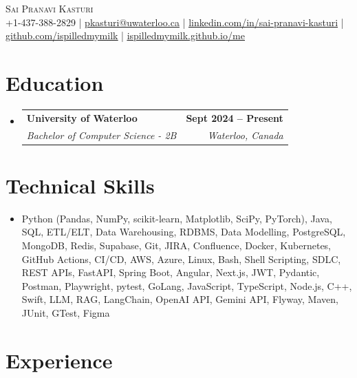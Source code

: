 \documentclass[letterpaper,10pt]{article}
\makeatletter
\newcommand{\resumeSubheading}[4]{
  \vspace{-1pt}\item
    \begin{tabular*}{1.0\textwidth}[t]{l@{\extracolsep{\fill}}r}
      \textbf{#1} & \textbf{\small #2} \\
      \textit{\small#3} & \textit{\small #4} \\[-2pt]
    \end{tabular*}\vspace{-7pt}
}
\newcommand{\resumeSubHeadingListStart}{\begin{itemize}[leftmargin=0.0in, label={}]}
\newcommand{\resumeSubHeadingListEnd}{\end{itemize}}
\makeatother
\begin{document}

\vspace{-28pt}
\begin{center}
    {\Huge \scshape Sai Pranavi Kasturi} \\ 
    
    \small +1-437-388-2829 | \underline{pkasturi@uwaterloo.ca} | \href{https://linkedin.com/in/sai-pranavi-kasturi-704807298}{\underline{linkedin.com/in/sai-pranavi-kasturi}} | \href{https://github.com/ispilledmymilk}{\underline{github.com/ispilledmymilk}} | \href{https://ispilledmymilk.github.io/me/}{\underline{ispilledmymilk.github.io/me}}
    \vspace{-10pt}
\end{center}

\vspace{-10pt}
\section{Education}
  \resumeSubHeadingListStart
    \resumeSubheading
      {University of Waterloo}{Sept 2024 -- Present}
      {Bachelor of Computer Science - 2B}{Waterloo, Canada}
  \resumeSubHeadingListEnd
\vspace{-8pt}
  

\section{Technical Skills}
\begin{itemize}[leftmargin=0.05in, label={}]
  \small\item{
    Python (Pandas, NumPy, scikit-learn, Matplotlib, SciPy, PyTorch), Java, SQL, ETL/ELT, Data Warehousing, RDBMS, Data Modelling, PostgreSQL, MongoDB, Redis, Supabase, Git, JIRA, Confluence, Docker, Kubernetes, GitHub Actions, CI/CD, AWS, Azure, Linux, Bash, Shell Scripting, SDLC, REST APIs, FastAPI, Spring Boot, Angular, Next.js, JWT, Pydantic, Postman, Playwright, pytest, GoLang, JavaScript, TypeScript, Node.js, C++, Swift, LLM, RAG, LangChain, OpenAI API, Gemini API, Flyway, Maven, JUnit, GTest, Figma
  }
\end{itemize}
 \vspace{-18pt}

\vspace{1.20pt}
\section{Experience}
\end{document}
